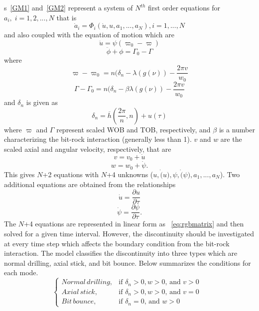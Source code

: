 \equationname{}s~\ref{GM1} and~\ref{GM2} represent a system of $N^{th}$ first order equations for $a_i,\; i=1,2,...,N$ that is
\begin{equation}\label{Norder}
  \dot{a}_i = \Phi_i(\dot{u}, u, a_1, ..., a_N), i=1,...,N
\end{equation}
and also coupled with the equation of motion which are
\begin{equation}\label{GE1_}
  \ddot{u} = \psi(\varpi_0 - \varpi)
\end{equation}
\begin{equation}\label{GE2_}
  \ddot{\phi} + \phi = \Gamma_0 - \Gamma
\end{equation}
where
\begin{equation}\label{GE1}
  \varpi-\varpi_0 = n(\delta_n - \lambda(g(\nu)) - \frac{2\pi v}{w_0}
\end{equation}
\begin{equation}\label{GE2}
  \Gamma-\Gamma_0 = n(\delta_n -\beta \lambda(g(\nu)) - \frac{2\pi v}{w_0}
\end{equation}
and $\delta_n$ is given as
\begin{equation}\label{deltan1}
  \delta_n = \overline{h}\left(\frac{2\pi}{n}, n\right) + u(\tau)
\end{equation}
where $\varpi$ and $\Gamma$ represent scaled WOB and TOB, respectively, and $\beta$ is a number characterizing the bit-rock interaction (generally less than 1). $v$ and $w$ are the scaled axial and angular velocity, respectively, that are
\begin{equation}\label{scaled_axial_ve}
  v = v_0 + \dot{u}
\end{equation}
\begin{equation}\label{scaled_angular_vel}
  w = w_0 + \dot{\psi}.
\end{equation}
This gives $N$+2 equations with $N$+4 unknowns ($u, \dot(u), \psi, \dot(\psi), a_1, ..., a_N$). Two additional equations are obtained from the relationships
\begin{equation}\label{axial_dis_vel}
  \dot{u} = \frac{\partial u}{\partial \tau}
\end{equation}
\begin{equation}\label{angular_dis_vel}
  \dot{\psi} = \frac{\partial \psi}{\partial \tau}.
\end{equation}
The $N$+4 equations are represented in linear form as \equationname~\ref{eq:rgbmatrix} and then solved for a given time interval. However, the discontinuity should be investigated at every time step which affects the boundary condition from the bit-rock interaction. The model classifies the discontinuity into three types which are normal drilling, axial stick, and bit bounce. Below summarizes the conditions for each mode.
\begin{equation}\label{drillingmodes}
  \begin{cases}
    Normal\,drilling, & \mbox{if $\delta_n > 0, w > 0$, and $v > 0$ }  \\
    Axial\, stick, & \mbox{if $\delta_n >0, w > 0$, and $v = 0$ } \\
    Bit\,bounce, & \mbox{if $\delta_n = 0$, and $w > 0$}
  \end{cases}
\end{equation}

